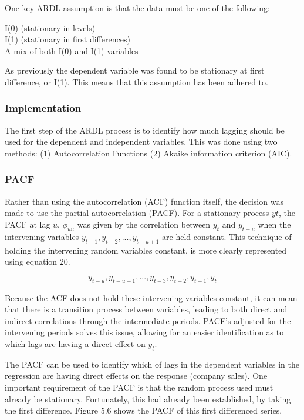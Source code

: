 \documentclass[11pt, a4paper]{article}
\begin{document}
One key ARDL assumption is that the data must be one of the following:

I(0) (stationary in levels)\\
I(1) (stationary in first differences)\\
A mix of both I(0) and I(1) variables

As previously the dependent variable was found to be stationary at first difference, or I(1). This means that this assumption has been adhered to. 

\subsubsection{Implementation}

The first step of the ARDL process is to identify how much lagging should be used for the dependent and independent variables. This was done using two methods: (1) Autocorrelation Functions (2) Akaike information criterion (AIC). 

\subsubsection*{PACF}

Rather than using the autocorrelation (ACF) function itself, the decision was made to use the partial autocorrelation (PACF). For a stationary process ${yt}$, the PACF at lag $u$, $\phi_{uu}$ was given by the correlation between $y_{t}$ and $y_{t-u}$ when the intervening variables $y_{t-1}, y_{t-2},...,y_{t-u+1}$ are held constant. This technique of holding the intervening random variables constant, is more clearly represented using equation 20.

\begin{equation}
\boxed{y_{t-u}}, y_{t-u+1}, ..., y_{t-3}, y_{t-2}, y_{t-1}, \boxed{y_{t}}
\end{equation}

Because the ACF does not hold these intervening variables constant, it can mean that there is a transition process between variables, leading to both direct and indirect correlations through the intermediate periods. PACF’s adjusted for the intervening periods solves this issue, allowing for an easier identification as to which lags are having a direct effect on $y_{t}$.

The PACF can be used to identify which of lags in the dependent variables in the regression are having direct effects on the response (company sales). One important requirement of the PACF is that the random process used must already be stationary. Fortunately, this had already been established, by taking the first difference. Figure 5.6 shows the PACF of this first differenced series.
\end{document}
